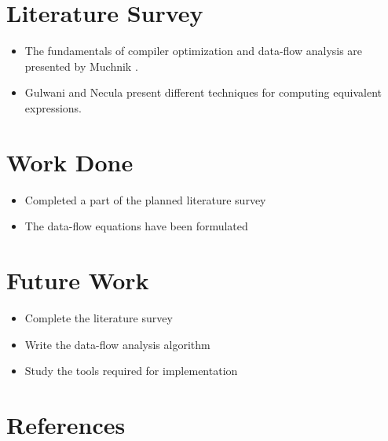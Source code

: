 \documentclass{beamer}
\begin{document}
\section{Literature Survey}
\begin{frame}{\insertsection}
\begin{itemize}
	\item The fundamentals of compiler optimization and data-flow analysis
		are presented by Muchnik  \cite{rfc3286}.
	\item Gulwani and Necula \cite{rfc4960} present different techniques
		for computing equivalent expressions.
\end{itemize}
\end{frame}

\section{Work Done}
\begin{frame}{\insertsection}
\begin{itemize}
	\item Completed a part of the planned literature survey
	\item The data-flow equations have been formulated
\end{itemize}
\end{frame}

\section{Future Work}
\begin{frame}{\insertsection}
\begin{itemize}
	\item Complete the literature survey
	\item Write the data-flow analysis algorithm
	\item Study the tools required for implementation
\end{itemize}
\end{frame}


\section{References}
\begin{frame}[allowframebreaks]
\frametitle<presentation>{\insertsection}
\printbibliography
\end{frame}
\end{document}
